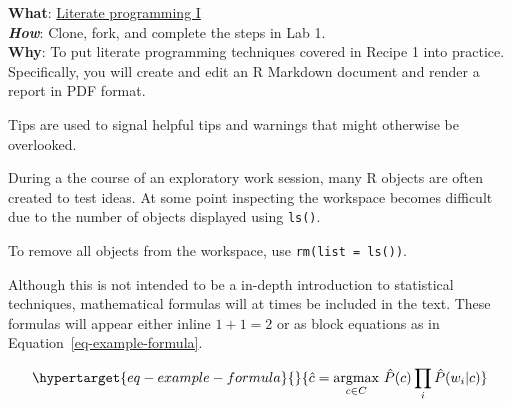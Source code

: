 \documentclass[
  letterpaper,
]{latex/krantz}
\begin{document}
\begin{tcolorbox}[enhanced jigsaw, opacitybacktitle=0.6, breakable, colframe=quarto-callout-tip-color-frame, arc=.35mm, left=2mm, leftrule=.75mm, title=\textcolor{quarto-callout-tip-color}{\faLightbulb}\hspace{0.5em}{Lab}, opacityback=0, colback=white, toptitle=1mm, rightrule=.15mm, titlerule=0mm, bottomtitle=1mm, bottomrule=.15mm, coltitle=black, colbacktitle=quarto-callout-tip-color!10!white, toprule=.15mm]
\textbf{What}: \href{https://github.com/lin380/lab_1}{Literate
programming I}\\
\textbf{\emph{How}}: Clone, fork, and complete the steps in Lab 1.\\
\textbf{Why}: To put literate programming techniques covered in Recipe 1
into practice. Specifically, you will create and edit an R Markdown
document and render a report in PDF format.
\end{tcolorbox}

Tips are used to signal helpful tips and warnings that might otherwise
be overlooked.

\begin{tcolorbox}[enhanced jigsaw, opacitybacktitle=0.6, breakable, colframe=quarto-callout-warning-color-frame, arc=.35mm, left=2mm, leftrule=.75mm, title=\textcolor{quarto-callout-warning-color}{\faExclamationTriangle}\hspace{0.5em}{Tip}, opacityback=0, colback=white, toptitle=1mm, rightrule=.15mm, titlerule=0mm, bottomtitle=1mm, bottomrule=.15mm, coltitle=black, colbacktitle=quarto-callout-warning-color!10!white, toprule=.15mm]
During a the course of an exploratory work session, many R objects are
often created to test ideas. At some point inspecting the workspace
becomes difficult due to the number of objects displayed using
\texttt{ls()}.

To remove all objects from the workspace, use
\texttt{rm(list\ =\ ls())}.
\end{tcolorbox}

Although this is not intended to be a in-depth introduction to
statistical techniques, mathematical formulas will at times be included
in the text. These formulas will appear either inline \(1 + 1 = 2\) or
as block equations as in Equation~\ref{eq-example-formula}.

\begin{equation}\protect\hypertarget{eq-example-formula}{}{
\hat{c} = \underset{c \in C} {\mathrm{argmax}} ~\hat{P}(c) \prod_i \hat{P}(w_i|c)
}\label{eq-example-formula}\end{equation}
\end{document}

